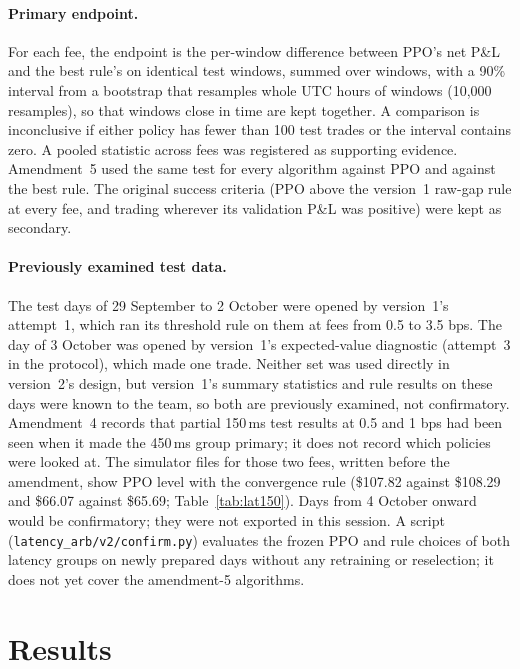 \documentclass[12pt,a4paper]{article}
\DeclareRobustCommand{\bps}{\ifmmode\,\text{bps}\else\,bps\fi}
\newcommand{\usd}[1]{\$#1}
\begin{document}
\paragraph{Primary endpoint.} For each fee, the endpoint is the per-window difference
between PPO's net P\&L and the best rule's on identical test windows, summed over windows,
with a 90\% interval from a bootstrap that resamples whole UTC hours of windows (10,000
resamples), so that windows close in time are kept together. A comparison is inconclusive if
either policy has fewer than 100 test trades or the interval contains zero. A pooled
statistic across fees was registered as supporting evidence. Amendment~5 used
the same test for every algorithm against PPO and against the best rule. The original success
criteria (PPO above the version~1 raw-gap rule at every fee, and trading wherever its
validation P\&L was positive) were kept as secondary.

\paragraph{Previously examined test data.} The test days of 29 September to 2 October were
opened by version~1's attempt~1, which ran its threshold rule on them at fees from 0.5 to
3.5\bps. The day of 3 October was opened by version~1's expected-value diagnostic (attempt~3
in the protocol), which made one trade. Neither set was used directly in version~2's design,
but version~1's summary statistics and rule results on these days were known to the team, so
both are previously examined, not confirmatory. Amendment~4 records that partial 150\,ms test
results at 0.5 and 1\bps{} had been seen when it made the 450\,ms group primary; it does not
record which policies were looked at. The simulator files for those two fees, written before
the amendment, show PPO level with the convergence rule (\usd{107.82} against \usd{108.29} and
\usd{66.07} against \usd{65.69}; Table~\ref{tab:lat150}). Days from 4 October onward would be
confirmatory; they were not exported in this session. A script
(\texttt{latency\_arb/v2/confirm.py}) evaluates the frozen PPO and rule choices of both
latency groups on newly prepared days without any retraining or reselection; it does not yet
cover the amendment-5 algorithms.

\section{Results}\label{sec:results}
\end{document}
